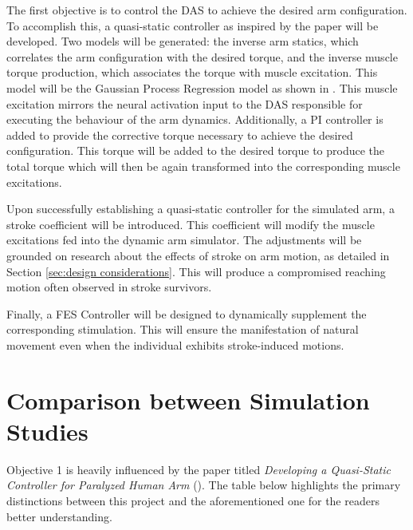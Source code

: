 The first objective is to control the \ac{DAS} to achieve the desired arm configuration. To accomplish this, a quasi-static controller as inspired by the paper \cite{QSC} will be developed. Two models will be generated: the inverse arm statics, which correlates the arm configuration with the desired torque, and the inverse muscle torque production, which associates the torque with muscle excitation. This model will be the Gaussian Process Regression model as shown in \cite{QSC}. This muscle excitation mirrors the neural activation input to the \ac{DAS} responsible for executing the behaviour of the arm dynamics. Additionally, a PI controller is added to provide the corrective torque necessary to achieve the desired configuration. This torque will be added to the desired torque to produce the total torque which will then be again transformed into the corresponding muscle excitations. 

Upon successfully establishing a quasi-static controller for the simulated arm, a stroke coefficient will be introduced. This coefficient will modify the muscle excitations fed into the dynamic arm simulator. The adjustments will be grounded on research about the effects of stroke on arm motion, as detailed in Section \ref{sec:design considerations}. This will produce a compromised reaching motion often observed in stroke survivors.

Finally, a FES Controller will be designed to dynamically supplement the corresponding stimulation. This will ensure the manifestation of natural movement even when the individual exhibits stroke-induced motions.



\newpage
\section{Comparison between Simulation Studies}

Objective 1 is heavily influenced by the paper titled \textit{Developing a Quasi-Static Controller for Paralyzed Human Arm} (\cite{QSC}). The table below highlights the primary distinctions between this project and the aforementioned one for the readers better understanding. 

